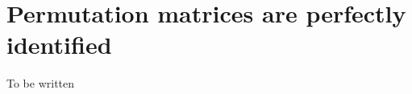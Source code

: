 \section{Permutation matrices are perfectly identified}

\label{sec:miracle}

To be written








































